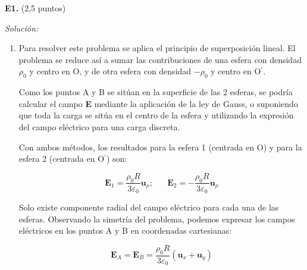 \textbf{E1.} (2,5 puntos)


\vspace{20px}
\textit{Solución:}
\\

\begin{enumerate}
[label=\alph*)]
    \item Para resolver este problema se aplica el principio de superposición lineal. El problema se reduce así
    a sumar las contribuciones de una esfera con densidad $\rho_0$ y centro en O, y de otra esfera
    con densidad $-\rho_0$ y centro en O$^\prime$.

    Como los puntos A y B se sitúan en la superficie de las 2 esferas, se podría calcular el campo \textbf{E} mediante
    la aplicación de la ley de Gauss, o suponiendo que toda la carga se sitúa en el centro de la esfera y
    utilizando la expresión del campo eléctrico para una carga discreta.

    Con ambos métodos, los resultados para la esfera 1 (centrada en O) y para la esfera 2 (centrada en O$^\prime$) son:

    \begin{equation*}
        \mathbf{E}_1 = \frac{\rho_0 R}{3 \varepsilon_0} \mathbf{u}_{\rho}; \hspace{20pt}
        \mathbf{E}_2 = - \frac{\rho_0 R}{3 \varepsilon_0} \mathbf{u}_{\rho}
    \end{equation*}

    Solo existe componente radial del campo eléctrico para cada una de las esferas. Observando la simetría del
    problema, podemos expresar los campos eléctricos en los puntos A y B en coordenadas cartesianas:

    \begin{equation*}
        \mathbf{E}_A =  \mathbf{E}_B = \frac{\rho_0 R}{3 \varepsilon_0} (\mathbf{u}_x + \mathbf{u}_y )
    \end{equation*}

\end{enumerate}